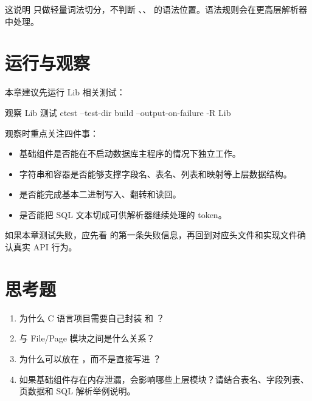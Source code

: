 这说明  只做轻量词法切分，不判断 、、 的语法位置。语法规则会在更高层解析器中处理。

\section{运行与观察}
\label{sec:lib-run}

本章建议先运行 Lib 相关测试：

\begin{dbcode}[listing options={language=bash,numbers=none}]{观察 Lib 测试}
ctest --test-dir build --output-on-failure -R Lib
\end{dbcode}

观察时重点关注四件事：

\begin{itemize}
  \item 基础组件是否能在不启动数据库主程序的情况下独立工作。
  \item 字符串和容器是否能够支撑字段名、表名、列表和映射等上层数据结构。
  \item {} 是否能完成基本二进制写入、翻转和读回。
  \item {} 是否能把 SQL 文本切成可供解析器继续处理的 token。
\end{itemize}

如果本章测试失败，应先看  的第一条失败信息，再回到对应头文件和实现文件确认真实 API 行为。

\section{思考题}
\label{sec:lib-questions}

\begin{enumerate}
  \item 为什么 C 语言项目需要自己封装  和 ？
  \item {} 与 File/Page 模块之间是什么关系？
  \item {} 为什么可以放在 ，而不是直接写进 ？
  \item 如果基础组件存在内存泄漏，会影响哪些上层模块？请结合表名、字段列表、页数据和 SQL 解析举例说明。
\end{enumerate}
